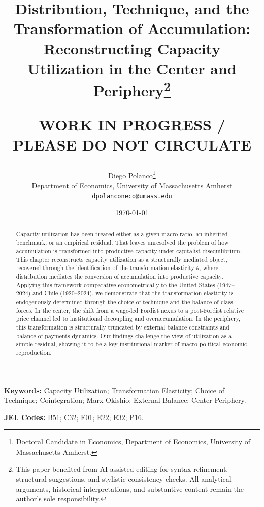 \documentclass[11pt]{article}
\title{Distribution, Technique, and the Transformation of Accumulation: Reconstructing Capacity Utilization in the Center and Periphery\thanks{This paper benefited from AI-assisted editing for syntax refinement, structural suggestions, and stylistic consistency checks. All analytical arguments, historical interpretations, and substantive content remain the author's sole responsibility.}\\
\begin{large}
\textbf{WORK IN PROGRESS / PLEASE DO NOT CIRCULATE}     
\end{large}
}
\author{Diego Polanco\thanks{Doctoral Candidate in Economics, Department of Economics, University of Massachusetts Amherst.}\\
Department of Economics, University of Massachusetts Amherst\\
\texttt{dpolanconeco@umass.edu}}
\date{\today}
\begin{document}
\maketitle

\begin{abstract}
Capacity utilization has been treated either as a given macro ratio, an inherited benchmark, or an empirical residual. That leaves unresolved the problem of how accumulation is transformed into productive capacity under capitalist disequilibrium. This chapter reconstructs capacity utilization as a structurally mediated object, recovered through the identification of the transformation elasticity $\theta$, where distribution mediates the conversion of accumulation into productive capacity. Applying this framework comparative-econometrically to the United States (1947–2024) and Chile (1920–2024), we demonstrate that the transformation elasticity is endogenously determined through the choice of technique and the balance of class forces. In the center, the shift from a wage-led Fordist nexus to a post-Fordist relative price channel led to institutional decoupling and overaccumulation. In the periphery, this transformation is structurally truncated by external balance constraints and balance of payments dynamics. Our findings challenge the view of utilization as a simple residual, showing it to be a key institutional marker of macro-political-economic reproduction.
\end{abstract}

\vspace{1cm}

\noindent\textbf{Keywords:} Capacity Utilization; Transformation Elasticity; Choice of Technique; Cointegration; Marx-Okishio; External Balance; Center-Periphery.

\noindent\textbf{JEL Codes:} B51; C32; E01; E22; E32; P16.

\pagebreak

\FloatBarrier

\FloatBarrier

\FloatBarrier

\FloatBarrier

\FloatBarrier

\FloatBarrier



\pagebreak




\pagebreak
\appendix
\FloatBarrier

\FloatBarrier

\FloatBarrier

\FloatBarrier

\FloatBarrier

\end{document}
